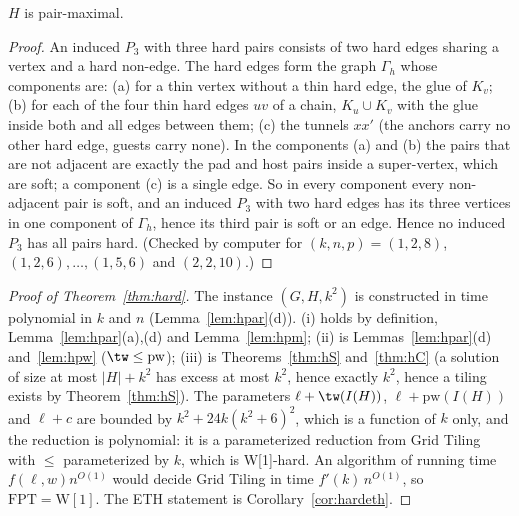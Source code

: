 \begin{lemma}\label{lem:hpm}
$H$ is pair-maximal.
\end{lemma}
\begin{proof}
An induced $P_3$ with three hard pairs consists of two hard edges sharing a vertex and a hard non-edge. The hard edges form the graph $\Gamma_h$ whose components are: (a) for a thin vertex without a thin hard edge, the glue of $K_v$; (b) for each of the four thin hard edges $uv$ of a chain, $K_u\cup K_v$ with the glue inside both and all edges between them; (c) the tunnels $xx'$ (the anchors carry no other hard edge, guests carry none). In the components (a) and (b) the pairs that are not adjacent are exactly the pad and host pairs inside a super-vertex, which are soft; a component (c) is a single edge. So in every component every non-adjacent pair is soft, and an induced $P_3$ with two hard edges has its three vertices in one component of $\Gamma_h$, hence its third pair is soft or an edge. Hence no induced $P_3$ has all pairs hard. (Checked by computer for $(k,n,p)=(1,2,8)$, $(1,2,6),\dots,(1,5,6)$ and $(2,2,10)$.)
\end{proof}

\begin{proof}[Proof of Theorem~\ref{thm:hard}]
The instance $(G,H,k^2)$ is constructed in time polynomial in $k$ and $n$ (Lemma~\ref{lem:hpar}(d)). (i) holds by definition, Lemma~\ref{lem:hpar}(a),(d) and Lemma~\ref{lem:hpm}; (ii) is Lemmas~\ref{lem:hpar}(d) and~\ref{lem:hpw} ($\tw\le\mathrm{pw}$); (iii) is Theorems~\ref{thm:hS} and~\ref{thm:hC} (a solution of size at most $|H|+k^2$ has excess at most $k^2$, hence exactly $k^2$, hence a tiling exists by Theorem~\ref{thm:hS}). The parameters $\ell+\tw(I(H))$, $\ell+\mathrm{pw}(I(H))$ and $\ell+c$ are bounded by $k^2+24k(k^2+6)^2$, which is a function of $k$ only, and the reduction is polynomial: it is a parameterized reduction from Grid Tiling with $\le$ parameterized by $k$, which is W[1]-hard. An algorithm of running time $f(\ell,w)n^{O(1)}$ would decide Grid Tiling in time $f'(k)\,n^{O(1)}$, so $\mathrm{FPT}=\mathrm{W[1]}$. The ETH statement is Corollary~\ref{cor:hardeth}.
\end{proof}

